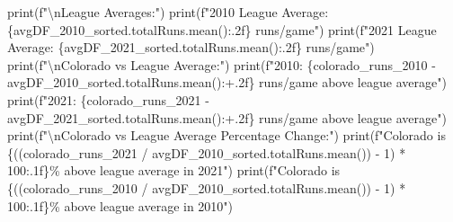 \documentclass[
  letterpaper,
  DIV=11,
  numbers=noendperiod]{scrartcl}
\newenvironment{Shaded}{\begin{snugshade}}{\end{snugshade}}
\newcommand{\BuiltInTok}[1]{\textcolor[rgb]{0.00,0.23,0.31}{#1}}
\newcommand{\CharTok}[1]{\textcolor[rgb]{0.13,0.47,0.30}{#1}}
\newcommand{\DecValTok}[1]{\textcolor[rgb]{0.68,0.00,0.00}{#1}}
\newcommand{\NormalTok}[1]{\textcolor[rgb]{0.00,0.23,0.31}{#1}}
\newcommand{\OperatorTok}[1]{\textcolor[rgb]{0.37,0.37,0.37}{#1}}
\newcommand{\SpecialCharTok}[1]{\textcolor[rgb]{0.37,0.37,0.37}{#1}}
\newcommand{\SpecialStringTok}[1]{\textcolor[rgb]{0.13,0.47,0.30}{#1}}
\begin{document}
\begin{tcolorbox}
\begin{Shaded}
\begin{Highlighting}[]
\BuiltInTok{print}\NormalTok{(}\SpecialStringTok{f"}\CharTok{\textbackslash{}n}\SpecialStringTok{League Averages:"}\NormalTok{)}
\BuiltInTok{print}\NormalTok{(}\SpecialStringTok{f"2010 League Average: }\SpecialCharTok{\{}\NormalTok{avgDF\_2010\_sorted}\SpecialCharTok{.}\NormalTok{totalRuns}\SpecialCharTok{.}\NormalTok{mean()}\SpecialCharTok{:.2f\}}\SpecialStringTok{ runs/game"}\NormalTok{)}
\BuiltInTok{print}\NormalTok{(}\SpecialStringTok{f"2021 League Average: }\SpecialCharTok{\{}\NormalTok{avgDF\_2021\_sorted}\SpecialCharTok{.}\NormalTok{totalRuns}\SpecialCharTok{.}\NormalTok{mean()}\SpecialCharTok{:.2f\}}\SpecialStringTok{ runs/game"}\NormalTok{)}
\BuiltInTok{print}\NormalTok{(}\SpecialStringTok{f"}\CharTok{\textbackslash{}n}\SpecialStringTok{Colorado vs League Average:"}\NormalTok{)}
\BuiltInTok{print}\NormalTok{(}\SpecialStringTok{f"2010: }\SpecialCharTok{\{}\NormalTok{colorado\_runs\_2010 }\OperatorTok{{-}}\NormalTok{ avgDF\_2010\_sorted}\SpecialCharTok{.}\NormalTok{totalRuns}\SpecialCharTok{.}\NormalTok{mean()}\SpecialCharTok{:+.2f\}}\SpecialStringTok{ runs/game above league average"}\NormalTok{)}
\BuiltInTok{print}\NormalTok{(}\SpecialStringTok{f"2021: }\SpecialCharTok{\{}\NormalTok{colorado\_runs\_2021 }\OperatorTok{{-}}\NormalTok{ avgDF\_2021\_sorted}\SpecialCharTok{.}\NormalTok{totalRuns}\SpecialCharTok{.}\NormalTok{mean()}\SpecialCharTok{:+.2f\}}\SpecialStringTok{ runs/game above league average"}\NormalTok{)}
\BuiltInTok{print}\NormalTok{(}\SpecialStringTok{f"}\CharTok{\textbackslash{}n}\SpecialStringTok{Colorado vs League Average Percentage Change:"}\NormalTok{)}
\BuiltInTok{print}\NormalTok{(}\SpecialStringTok{f"Colorado is }\SpecialCharTok{\{}\NormalTok{((colorado\_runs\_2021 }\OperatorTok{/}\NormalTok{ avgDF\_2010\_sorted.totalRuns.mean()) }\OperatorTok{{-}} \DecValTok{1}\NormalTok{) }\OperatorTok{*} \DecValTok{100}\SpecialCharTok{:.1f\}}\SpecialStringTok{\% above league average in 2021"}\NormalTok{)}
\BuiltInTok{print}\NormalTok{(}\SpecialStringTok{f"Colorado is }\SpecialCharTok{\{}\NormalTok{((colorado\_runs\_2010 }\OperatorTok{/}\NormalTok{ avgDF\_2010\_sorted.totalRuns.mean()) }\OperatorTok{{-}} \DecValTok{1}\NormalTok{) }\OperatorTok{*} \DecValTok{100}\SpecialCharTok{:.1f\}}\SpecialStringTok{\% above league average in 2010"}\NormalTok{)}
\end{Highlighting}
\end{Shaded}


\end{tcolorbox}
\end{document}
